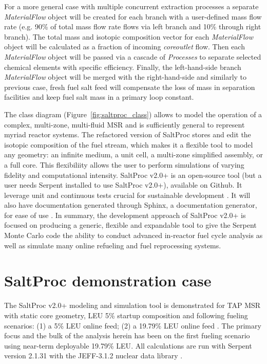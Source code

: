 \documentclass[12pt]{article} %
\begin{document}
For a more general case with multiple concurrent extraction processes a separate 
\textit{MaterialFlow} object will be created for each branch with a user-defined 
mass flow rate (e.g. 90\% of total mass flow rate flows via left branch and 
10\% through right branch). The total mass and isotopic composition vector 
for each \textit{MaterialFlow} object will be calculated as a fraction of incoming 
\textit{core\textunderscore outlet} flow. Then each \textit{MaterialFlow} object will be passed via a cascade of \textit{Processes} to separate selected chemical elements with 
specific efficiency. Finally, the left-hand-side branch \textit{MaterialFlow} object 
will be merged with the right-hand-side and similarly to previous case, fresh 
fuel salt feed will compensate the loss of mass in separation facilities and keep 
fuel salt mass in a primary loop constant.

The class diagram (Figure~\ref{fig:saltproc_class}) allows to model 
the operation of a complex, multi-zone, 
multi-fluid \gls{MSR} and is sufficiently general to represent myriad reactor 
systems. The refactored version of SaltProc stores and edit the 
isotopic composition of the fuel stream, which makes it a flexible tool to 
model any geometry: an infinite medium, a unit cell, a multi-zone simplified 
assembly, or a full core. This flexibiliity allows the user to perform 
simulations of varying fidelity and computational intensity. SaltProc v2.0+ is an 
open-source tool (but a user needs Serpent installed to use SaltProc v2.0+), 
available on Github. It leverage unit and continuous tests  
crucial for sustainable development \cite{krekel_pytest_2004}. It will also 
have documentation generated through Sphinx, a documentation generator, for ease 
of use \cite{brandl_sphinx_2009}. In summary, the 
development approach of SaltProc v2.0+ is focused on producing a generic, flexible and 
expandable tool to give the Serpent Monte Carlo code the ability to conduct 
advanced in-reactor fuel cycle analysis as well as simulate many 
online refueling and fuel reprocessing systems.

\section{SaltProc demonstration case}
The SaltProc v2.0+ modeling and simulation tool is demonstrated
for \gls{TAP} \gls{MSR} with static core geometry, \gls{LEU} 5\% 
startup composition 
\cite{transatomic_power_corporation_neutronics_2016} and following 
fueling scenarios: (1) a 5\% \gls{LEU} online feed; (2) a 19.79\% 
\gls{LEU} online feed \cite{betzler_assessment_2017}. 
The primary focus and the bulk of the analysis 
herein has been on the first fueling scenario using near-term 
deployable 19.79\% \gls{LEU}. All calculations are run with 
Serpent version 2.1.31 with the JEFF-3.1.2 nuclear data library \cite{leppanen_serpent_2013, oecd/nea_data_bank_jeff-3.1.2_2014}.
\end{document}
